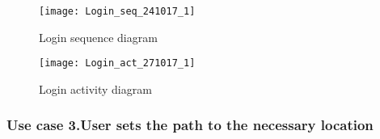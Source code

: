 \documentclass[a4paper,leqno]{book}
\begin{document}
\newpage
\begin{figure}[!h]
	\begin{center}
		\texttt{[image: Login\_seq\_241017\_1]}
	\end{center}
	\caption{Login sequence diagram}
\end{figure}

\begin{figure}[!h]
	\begin{center}
		\texttt{[image: Login\_act\_271017\_1]}
	\end{center}
	\caption{Login activity diagram}
\end{figure}

\newpage
\subsubsection{Use case 3.User sets the path to the necessary location}
\end{document}
